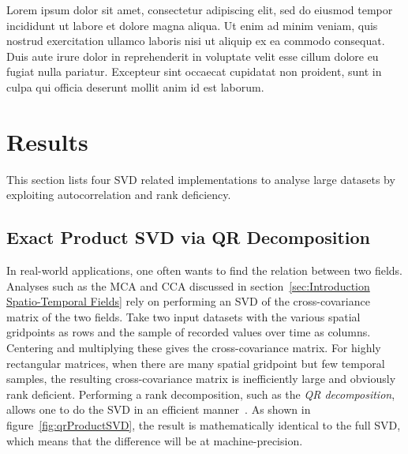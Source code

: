 \documentclass[ijgi,article,submit,moreauthors,pdftex,10pt,a4paper]{Definitions/mdpi}
\begin{document}
Lorem ipsum dolor sit amet, consectetur adipiscing elit, sed do eiusmod tempor incididunt ut labore et dolore magna aliqua. Ut enim ad minim veniam, quis nostrud exercitation ullamco laboris nisi ut aliquip ex ea commodo consequat. Duis aute irure dolor in reprehenderit in voluptate velit esse cillum dolore eu fugiat nulla pariatur. Excepteur sint occaecat cupidatat non proident, sunt in culpa qui officia deserunt mollit anim id est laborum.

\section{Results}


This section lists four SVD related implementations to analyse large datasets by exploiting autocorrelation and rank deficiency.

\subsection{Exact Product SVD via QR Decomposition}
\label{sec:Materials and Methods/Exact Product SVD via QR Decomposition}

In real-world applications, one often wants to find the relation between two fields. Analyses such as the MCA and CCA discussed in section~\ref{sec:Introduction Spatio-Temporal Fields} rely on performing an SVD of the cross-covariance matrix of the two fields. Take two input datasets with the various spatial gridpoints as rows and the sample of recorded values over time as columns. Centering and multiplying these gives the cross-covariance matrix. For highly rectangular matrices, when there are many spatial gridpoint but few temporal samples, the resulting cross-covariance matrix is inefficiently large and obviously rank deficient. Performing a rank decomposition, such as the \textit{QR decomposition}, allows one to do the SVD in an efficient manner~\cite{Chan1982, Tygert2017}. As shown in figure~\ref{fig:qrProductSVD}, the result is mathematically identical to the full SVD, which means that the difference will be at machine-precision.
\end{document}
